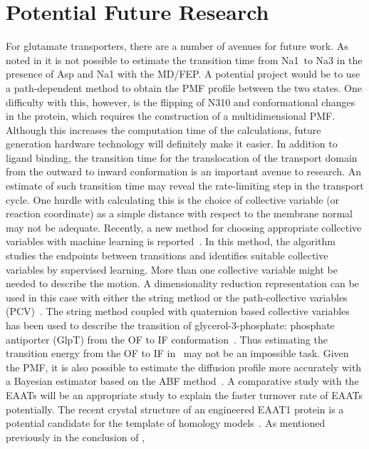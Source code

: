 \section{Potential Future Research}
For glutamate transporters, there are a number of avenues for future work. As noted in 
 it is not possible to estimate the transition time from Na1\prim\ to 
Na3 in the presence of Asp and Na1 with the MD/FEP. A potential project would be to use 
a path-dependent method to obtain the PMF profile between the two states. One difficulty 
with this, however, is the flipping of N310 and conformational changes in the protein, 
which requires the construction of a multidimensional PMF. Although this increases the 
computation time of the calculations, future generation hardware technology will definitely 
make it easier. In addition to ligand binding, the transition time for the translocation 
of the transport domain from the outward to inward conformation is an important avenue to 
research. An estimate of such transition time may reveal the rate-limiting step in the 
transport cycle. One hurdle with calculating this is the choice of collective variable (or 
reaction coordinate) as a simple distance with respect to the membrane normal may not be 
adequate. Recently, a new method for choosing appropriate collective variables with machine 
learning is reported~\cite{Sultan2018}. In this method, the algorithm studies the endpoints 
between transitions and identifies suitable collective variables by supervised learning. 
More than one collective variable might be needed to describe the motion. A dimensionality 
reduction representation can be used in this case with either the string method 
\cite{Gan2009,Maragliano2006} or the path-collective variables (PCV)~\cite{Branduardi2007}. 
The string method coupled with quaternion based collective variables has been used to describe 
the transition of glycerol-3-phosphate: phosphate antiporter (GlpT) from the OF to IF 
conformation~\cite{Moradi2015}. Thus estimating the transition energy from the OF to IF in 
\GltPh\ may not be an impossible task. Given the PMF, it is also possible to estimate the 
diffusion profile more accurately with a Bayesian estimator based on the ABF 
method~\cite{Comer2013a}. A comparative study with the EAATs will be an appropriate study 
to explain the faster turnover rate of EAATs potentially. The recent crystal structure of an 
engineered EAAT1 protein is a potential candidate for the template of homology 
models~\cite{Canul-Tec2017}. As mentioned previously in the conclusion of , 

